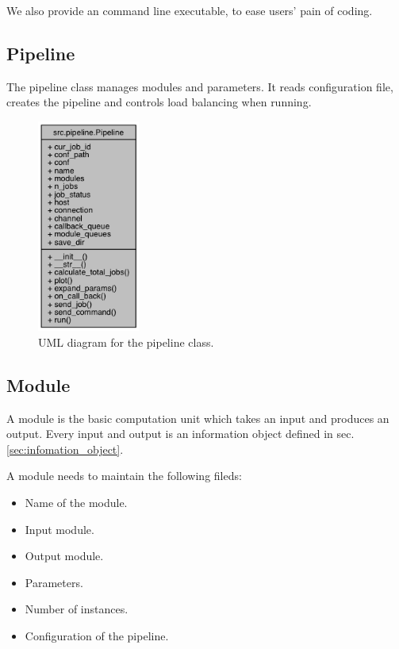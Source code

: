 \documentclass{article}
\begin{document}
    We also provide an command line executable, to ease users' pain of coding.


    \subsection{Pipeline}
    The pipeline class manages modules and parameters.
    It reads configuration file, creates the pipeline and controls load balancing when running.

    \begin{figure}[h]
        \begin{center}
            \includegraphics[width=0.3\textwidth]{fig/pipeline_uml.png}
        \end{center}
        \label{fig:pipeline_uml}
        \caption{UML diagram for the pipeline class.}
    \end{figure}

    \subsection{Module}
    A module is the basic computation unit which takes an input and produces an output.
    Every input and output is an information object defined in sec. \ref{sec:infomation_object}.

    A module needs to maintain the following fileds:
    \begin{itemize}
        \item Name of the module.
        \item Input module.
        \item Output module.
        \item Parameters.
        \item Number of instances.
        \item Configuration of the pipeline.
    \end{itemize}
\end{document}
